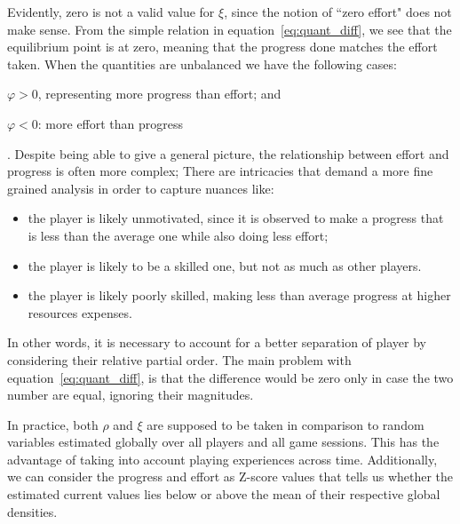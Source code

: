 Evidently, zero is not a valid value for $\xi$, since the notion of ``zero effort" does not make sense. %
From the simple relation in equation~\ref{eq:quant_diff}, we see that the equilibrium point is at zero, meaning that the progress done matches the effort taken. When the quantities are unbalanced we have the following cases:~\begin{enumerate*}[label=\alph*)]\item $\varphi > 0$, representing more progress than effort; and \item $\varphi < 0$: more effort than progress\end{enumerate*}. Despite being able to give a general picture, the relationship between effort and progress is often more complex; There are intricacies that demand a more fine grained analysis in order to capture nuances like: 
\begin{itemize}
    \item the player is likely unmotivated, since it is observed to make a progress that is less than the average one while also doing less effort;
    \item the player is likely to be a skilled one, but not as much as other players. %
    \item the player is likely poorly skilled, making less than average progress at higher resources expenses. %
\end{itemize}

In other words, it is necessary to account for a better separation of player by considering their relative partial order. The main problem with equation~\ref{eq:quant_diff}, is that the difference would be zero only in case the two number are equal, ignoring their magnitudes.

In practice, both $\rho$ and $\xi$ are supposed to be taken in comparison to random variables estimated globally over all players and all game sessions. This has the advantage of taking into account playing experiences across time. Additionally, we can consider the progress and effort as Z-score values that tells us whether the estimated current values lies below or above the mean of their respective global densities. 

